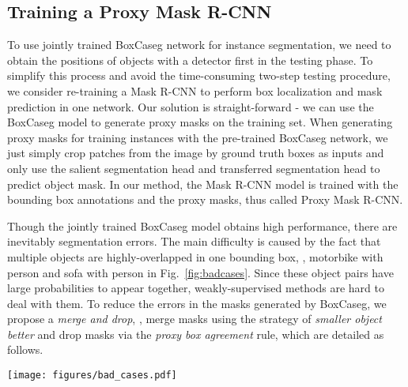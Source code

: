 \documentclass[final]{cvpr}
\begin{document}
\subsection{Training a Proxy Mask R-CNN}\label{sec:retraining}

To use jointly trained BoxCaseg network for instance segmentation, we need to obtain the positions of objects with a detector first in the testing phase. To simplify this process and avoid the time-consuming two-step testing procedure, we consider re-training a Mask R-CNN to perform box localization and mask prediction in one network. Our solution is straight-forward - we can use the BoxCaseg model to generate proxy masks on the training set. When generating proxy masks for training instances with the pre-trained BoxCaseg network, we just simply crop patches from the image by ground truth boxes as inputs and only use the salient segmentation head and transferred segmentation head to predict object mask. In our method, the Mask R-CNN model is trained with the bounding box annotations and the proxy masks, thus called Proxy Mask R-CNN. 

Though the jointly trained BoxCaseg model obtains high performance, there are inevitably segmentation errors. The main difficulty is caused by the fact that multiple objects are highly-overlapped in one bounding box, \eg, motorbike with person and sofa with person in Fig.~\ref{fig:badcases}. Since these object pairs have large probabilities to appear together, weakly-supervised methods are hard to deal with them. To reduce the errors in the masks generated by BoxCaseg, we propose a \textit{merge and drop}, \ie, merge masks using the strategy of \textit{smaller object better} and drop masks via the \textit{proxy box agreement} rule, which are detailed as follows.

\begin{figure*}[htp]
\centering
\texttt{[image: figures/bad\_cases.pdf]}
\caption{From the prediction results of BoxCaseg (a\&b) to the proxy masks (d). Since there are two highly-overlapped objects in each image. BoxCaseg predicts two masks with errors. We first merge the two predicted masks using the \textit{smaller object better} strategy and then drop bad masks (\eg, the sofa mask in bottom row) according to the \textit{proxy box agreement} rule. In this case, the bounding box of the sofa mask in (c) has low agreement (\ie, low IoU) with its ground truth box, so the sofa mask is dropped.}
\label{fig:badcases}
\end{figure*}
\end{document}
